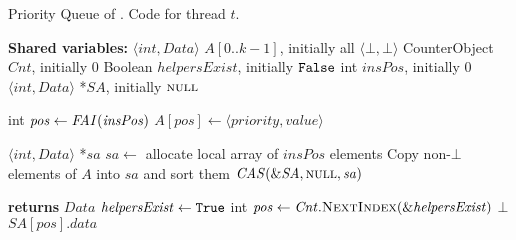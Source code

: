     \begin{algorithm}[t]
        \footnotesize
        \caption{Priority Queue of \Fresh. Code for thread $t$.}
        \label{alg:pq}
        \begin{algorithmic}[1]
    
            \State \textbf{Shared variables:}
            \State $\mathit{\langle int, Data \rangle}$ $A[0..k-1]$, initially all $\langle \bot, \bot \rangle$
            \State CounterObject $\mathit{Cnt}$, initially $0$
            \State Boolean $\mathit{helpersExist}$, initially $\mbox{\texttt{False}}$
            \State int $\mathit{insPos}$, initially $0$
            \State $\mathit{\langle int, Data \rangle}$ *$\mathit{SA}$, initially $\mbox{\sc null}$
    
            \vspace{2mm}
            
                \State int $\mathit{pos} \gets \mbox{\textit{FAI}}(\mathit{insPos})$ \label{alg:pq:ins:FAI}
                \State $\mathit{A[pos]} \gets \langle \mathit{priority, value} \rangle$ \label{alg:pq:ins:store}
            \EndProcedure
    
            \vspace{2mm}
    
                \State $\mathit{\langle int, Data \rangle}$ *$\mathit{sa}$
                \State $\mathit{sa} \gets$ allocate local array of $insPos$ elements
                \State Copy non-$\bot$ elements of $A$ into $\mathit{sa}$ and sort them \label{alg:sa:local-copy}
                \State $\mathit{\mbox{\textit{CAS}}(\&SA, \mbox{\sc null}, sa)}$ \label{alg:sa:CAS}
            \EndProcedure
    
            \vspace{2mm}
    
             \textbf{returns} $\mathit{Data}$
                    \State $\mathit{helpersExist} \gets \mbox{\texttt{True}}$
                \EndIf
                \State int $\mathit{pos} \gets \mathit{Cnt.\mbox{\sc NextIndex}(\&helpersExist})$ \label{alg:pq:deleteMin:next}
                    \State \Return $\bot$
                \EndIf
                \State \Return $\mathit{SA[pos].data}$
            \EndFunction
    
        \end{algorithmic}
    \end{algorithm}
    
